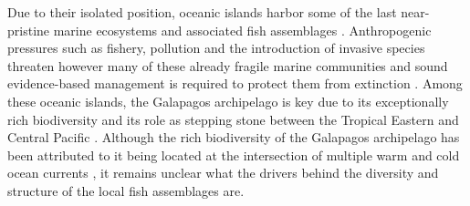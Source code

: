 Due to their isolated position, oceanic islands harbor some of the last near-pristine marine ecosystems and associated fish assemblages \citep{Sandin2008IslandFish,Friedlander2016MarineHotspots}. Anthropogenic pressures such as fishery, pollution and the introduction of invasive species threaten however many of these already fragile marine communities and sound evidence-based management is required to protect them from extinction \citep{Vitousek1988ChapterIslands,Wilson2010HabitatCommunities}. Among these oceanic islands, the Galapagos archipelago is key due to its exceptionally rich biodiversity and its role as stepping stone between the Tropical Eastern and Central Pacific \citep{Edgar2004,Quimbayo2019DeterminantsIslands}. %
Although the rich biodiversity of the Galapagos archipelago has been attributed to it being located at the intersection of multiple warm and cold ocean currents \citep{Palacios2004SeasonalInfluences}, it remains unclear what the drivers behind the diversity and structure of the local fish assemblages are. 

